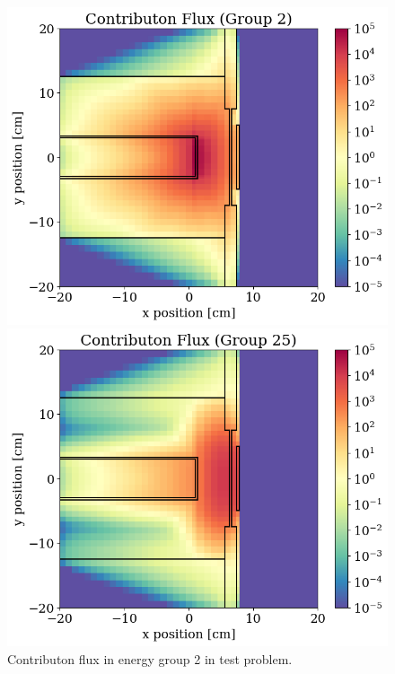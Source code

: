 \begin{figure}
  \begin{minipage}{0.495\linewidth}
    \centering
    \includegraphics[width=\linewidth]{content/testprob/scalar_flux_con_g02.png}
    \caption{Contributon flux in energy group 2 in test problem.}
    \label{fig:tp:scalar_flux_con_g02}
  \end{minipage}
  \hfill
  \begin{minipage}{0.495\linewidth}
    \centering
    \includegraphics[width=\linewidth]{content/testprob/scalar_flux_con_g25.png}

\end{minipage}
\end{figure}
